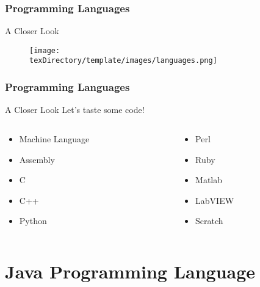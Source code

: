 \documentclass[10pt, compress]{beamer}
\begin{document}
\begin{frame}[fragile]
	\frametitle{Programming Languages}
	\begin{block}{A Closer Look}
		\begin{figure}\centering
			\texttt{[image: \\texDirectory/template/images/languages.png]}
		\end{figure}
	\end{block}
\end{frame}

\begin{frame}[fragile]
	\frametitle{Programming Languages}
	\begin{block}{A Closer Look}
		Let's taste some code!
		\begin{columns}
			\begin{column}{0.5\textwidth}
			\begin{itemize}
				\item[] Machine Language
				\item[] Assembly
				\item[] C
				\item[] C++
				\item[] Python
			\end{itemize}
			\end{column}
			\begin{column}{0.5\textwidth}
			\begin{itemize}
				\item[] Perl
				\item[] Ruby
				\item[] Matlab
				\item[] LabVIEW
				\item[] Scratch
			\end{itemize}
			\end{column}
		\end{columns}
	\end{block}
\end{frame}

\section{Java Programming Language}
\end{document}
